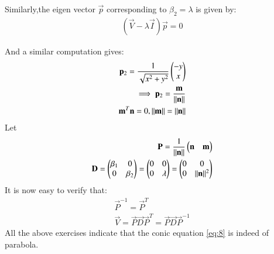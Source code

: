 \documentclass[journal,12pt,twocolumn]{IEEEtran}
\begin{document}
Similarly,the eigen vector $\vec{p}$ corresponding to $\beta_{2}=\lambda$ is given by:
\begin{align}
(\vec{V}-\lambda{\vec{I}})\vec{p}=0
\end{align}

And a similar computation gives:
\begin{align}
\mathbf{p}_{2}=\frac{1}{\sqrt{x^2+y^2}}\begin{pmatrix}-y\\x\end{pmatrix}\\
\implies\mathbf{p}_{2}=\frac{\mathbf{m}}{\Vert\mathbf{n}\rVert}\\
\mathbf{m}^T\mathbf{n}=0, \Vert\mathbf{m}\rVert=\Vert\mathbf{n}\rVert
\end{align}
Let
\begin{align}
\mathbf{P}=\frac{1}{\Vert\mathbf{n}\rVert}\begin{pmatrix}\mathbf{n}&\mathbf{m}\end{pmatrix}\\
\mathbf{D}=\begin{pmatrix}\beta_{1}&0\\0&\beta_{2}\end{pmatrix}=\begin{pmatrix}0&0\\0&\lambda\end{pmatrix}=\begin{pmatrix}0&0\\0&\Vert\mathbf{n}\rVert^2\end{pmatrix}
\end{align}
It is now easy to verify that:
\begin{align}
\vec{P}^{-1}=\vec{P}^T\\
\vec{V}=\vec{P}\vec{D}\vec{P}^T=\vec{P}\vec{D}\vec{P}^{-1}
\end{align}
All the above exercises indicate that the conic equation \eqref{eq:8} is indeed of parabola.
\end{document}

